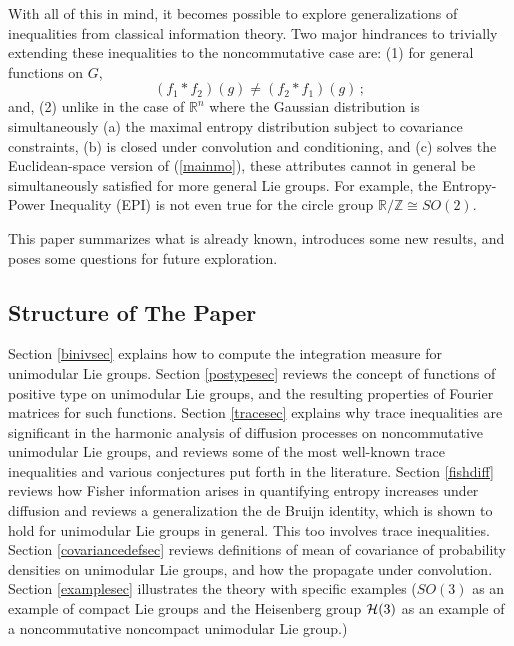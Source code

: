 \documentclass{svmult}
\newcommand{\IR}{\mathbb{R}}
\newcommand{\IZ}{\mathbb{Z}}
\begin{document}
With all of this in mind, it becomes possible to explore generalizations of inequalities from classical information theory.
Two major hindrances to trivially extending these inequalities to the noncommutative case are:
(1) for general functions on $G$,
$$ (f_1 * f_2)(g) \neq (f_2 * f_1)(g)\,; $$
and, (2) unlike in the case of $\IR^n$ where the Gaussian distribution is simultaneously (a) the
maximal entropy distribution subject to covariance constraints, (b) is closed under convolution and
conditioning, and (c) solves the Euclidean-space version of (\ref{mainmo}),
these attributes cannot in general be simultaneously satisfied for more general Lie groups.
For example, the Entropy-Power Inequality (EPI) is not even true for
the circle group $\IR/\IZ \cong SO(2)$.

This paper summarizes what is already known, introduces some new results, and poses some questions for future exploration.

\subsection{Structure of The Paper}

Section \ref{binivsec} explains how to compute the integration measure for unimodular Lie groups.
Section \ref{postypesec} reviews the concept of functions of positive type on unimodular Lie groups, and the resulting properties of Fourier matrices for such functions.
Section \ref{tracesec} explains why trace inequalities are significant in the harmonic
analysis of diffusion processes on noncommutative unimodular Lie groups, and reviews some of the most well-known trace inequalities and various conjectures put forth in the literature.
Section \ref{fishdiff} reviews how Fisher information arises in quantifying entropy increases under diffusion and reviews a generalization the de Bruijn identity, which is shown to hold for unimodular Lie groups in general. This too involves trace inequalities.
Section \ref{covariancedefsec} reviews definitions of mean of covariance of probability densities on unimodular Lie groups, and how the propagate under convolution. Section \ref{examplesec} illustrates the theory with specific examples ($SO(3)$ as
an example of compact Lie groups and the Heisenberg group ${\cal H}(3)$ as an example of
a noncommutative noncompact unimodular Lie group.)
\end{document}

